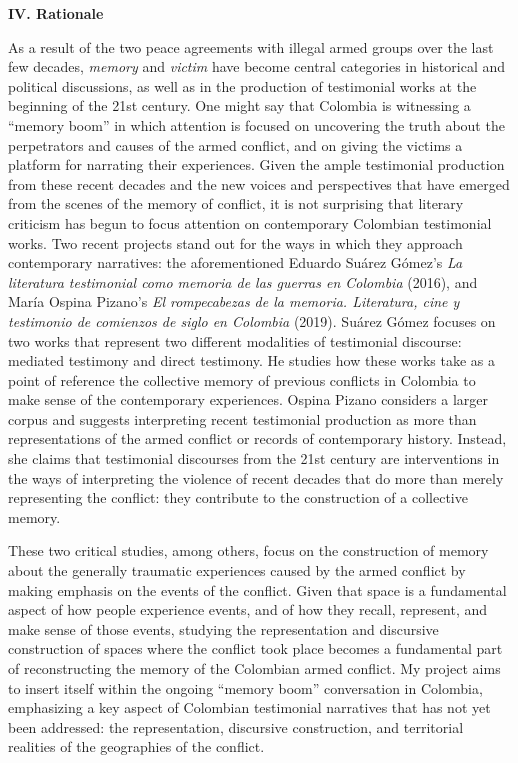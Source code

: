 \documentclass[
  11pt,
,
onecolumn,
openany
]{book}
\begin{document}
\textbf{IV. Rationale}

As a result of the two peace agreements with illegal armed groups over the
last few decades, \emph{memory} and \emph{victim} have become central
categories in historical and political discussions, as well as in the
production of testimonial works at the beginning of the 21st century. One
might say that Colombia is witnessing a ``memory boom'' in which attention is
focused on uncovering the truth about the perpetrators and causes of the armed
conflict, and on giving the victims a platform for narrating their
experiences. Given the ample testimonial production from these recent decades
and the new voices and perspectives that have emerged from the scenes of the
memory of conflict, it is not surprising that literary criticism has begun to
focus attention on contemporary Colombian testimonial works. Two recent
projects stand out for the ways in which they approach contemporary
narratives: the aforementioned Eduardo Suárez Gómez's \emph{La literatura
testimonial como memoria de las guerras en Colombia} (2016), and María Ospina
Pizano's \emph{El rompecabezas de la memoria. Literatura, cine y testimonio de
comienzos de siglo en Colombia} (2019). Suárez Gómez focuses on two works that
represent two different modalities of testimonial discourse: mediated
testimony and direct testimony. He studies how these works take as a point of
reference the collective memory of previous conflicts in Colombia to make
sense of the contemporary experiences. Ospina Pizano considers a larger corpus
and suggests interpreting recent testimonial production as more than
representations of the armed conflict or records of contemporary history.
Instead, she claims that testimonial discourses from the 21st century are
interventions in the ways of interpreting the violence of recent decades that
do more than merely representing the conflict: they contribute to the
construction of a collective memory.

These two critical studies, among others, focus on the construction of memory
about the generally traumatic experiences caused by the armed conflict by
making emphasis on the events of the conflict. Given that space is a
fundamental aspect of how people experience events, and of how they recall,
represent, and make sense of those events, studying the representation and
discursive construction of spaces where the conflict took place becomes a
fundamental part of reconstructing the memory of the Colombian armed conflict.
My project aims to insert itself within the ongoing ``memory boom''
conversation in Colombia, emphasizing a key aspect of Colombian testimonial
narratives that has not yet been addressed: the representation, discursive
construction, and territorial realities of the geographies of the conflict.
\end{document}

